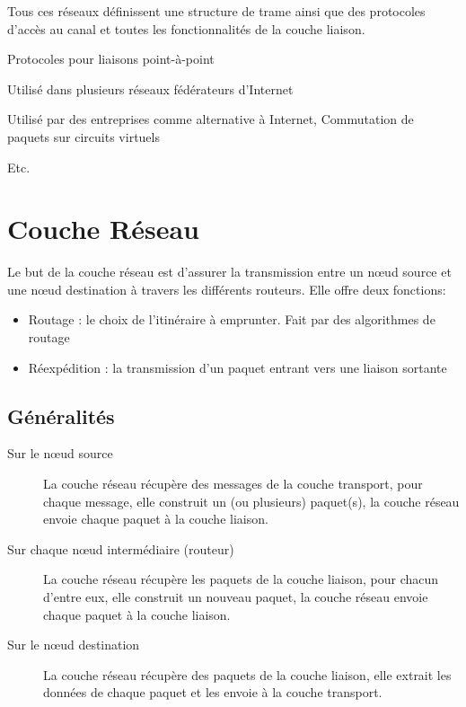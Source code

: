 \documentclass[a4paper, 12pt, french]{article}
\begin{document}
	Tous ces réseaux définissent une structure de trame ainsi que des protocoles d'accès au canal et toutes les fonctionnalités de la couche liaison.\\

	\begin{description}
		\item[PPP (point to point protocol)] Protocoles pour liaisons point-à-point 
		\item[ATM (asynchronous transfer mode)] Utilisé dans plusieurs réseaux fédérateurs d'Internet
		\item[Relais de trames (amélioration de X.25)] Utilisé par des entreprises comme alternative à Internet, Commutation de paquets sur circuits virtuels
		\item{Etc.}
	\end{description}

	\section{Couche Réseau}

	Le but de la couche réseau est d'assurer la transmission entre un nœud source et une nœud destination à travers les différents routeurs. Elle offre deux fonctions:

	\begin{itemize}
		\item Routage : le choix de l'itinéraire à emprunter. Fait par des algorithmes de routage
		\item Réexpédition : la transmission d'un paquet entrant vers une liaison sortante
	\end{itemize}

	\subsection{Généralités}

	\begin{description}
		\item[Sur le nœud source] La couche réseau récupère des messages de la couche transport, pour chaque message, elle construit un (ou plusieurs) paquet(s), la couche réseau envoie chaque paquet à la couche liaison.
		\item[Sur chaque nœud intermédiaire (routeur)] La couche réseau récupère les paquets de la couche liaison, pour chacun d’entre eux, elle construit un nouveau paquet, la couche réseau envoie chaque paquet à la couche liaison.
		\item[Sur le nœud destination] La couche réseau récupère des paquets de la couche liaison, elle extrait les données de chaque paquet et les envoie à la couche transport.
	\end{description}
\end{document}

